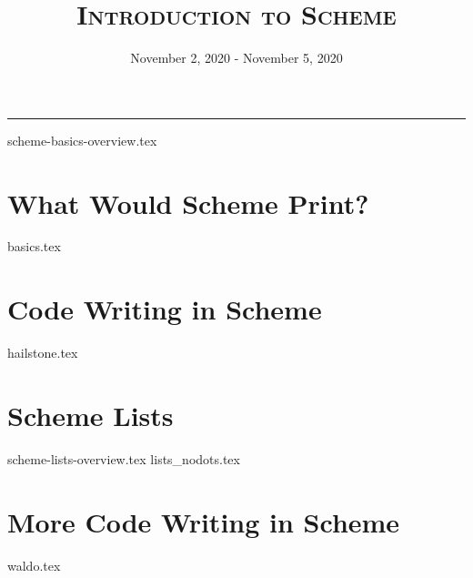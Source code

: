 \documentclass{exam}
\title{\textsc{Introduction to Scheme}}
\date{November 2, 2020 - November 5, 2020}
\begin{document}
\maketitle
\rule{\textwidth}{0.15em}
\fontsize{12}{15}\selectfont

{scheme-basics-overview.tex}
\begin{questions}
\section{What Would Scheme Print?}
{basics.tex}

\section{Code Writing in Scheme}
{hailstone.tex}
\section{Scheme Lists}
{scheme-lists-overview.tex}
\newpage
{lists_nodots.tex}

\section{More Code Writing in Scheme}
{waldo.tex}
\end{questions}
\end{document}
